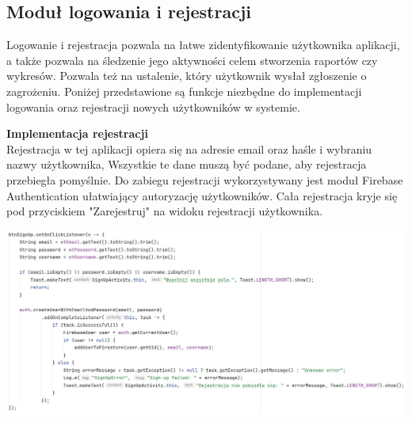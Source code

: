 \subsection{Moduł logowania i rejestracji}
Logowanie i rejestracja pozwala na łatwe zidentyfikowanie użytkownika aplikacji, a także pozwala na śledzenie jego aktywności celem stworzenia raportów czy wykresów. Pozwala też na ustalenie, który użytkownik wysłał zgłoszenie o zagrożeniu. Poniżej przedstawione są funkcje niezbędne do implementacji logowania oraz rejestracji nowych użytkowników w systemie.

\textbf{Implementacja rejestracji}\\
Rejestracja w tej aplikacji opiera się na adresie email oraz haśle i wybraniu nazwy użytkownika, Wszystkie te dane muszą być podane, aby rejestracja przebiegła pomyślnie. Do zabiegu rejestracji wykorzystywany jest moduł Firebase Authentication ułatwiający autoryzację użytkowników. Cała rejestracja kryje się pod przyciskiem "Zarejestruj" na widoku rejestracji użytkownika.\\
\noindent
\begin{minipage}{\linewidth}
    \label{lst:register}
    \centering
    \includegraphics[width=0.8\linewidth]{img/kod/imp-reje.jpg}
\end{minipage}

